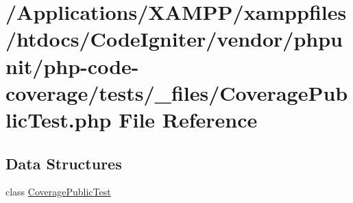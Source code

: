 \hypertarget{php-code-coverage_2tests_2__files_2_coverage_public_test_8php}{}\section{/\+Applications/\+X\+A\+M\+P\+P/xamppfiles/htdocs/\+Code\+Igniter/vendor/phpunit/php-\/code-\/coverage/tests/\+\_\+files/\+Coverage\+Public\+Test.php File Reference}
\label{php-code-coverage_2tests_2__files_2_coverage_public_test_8php}
\subsection*{Data Structures}
\begin{DoxyCompactItemize}
\item 
class \mbox{\hyperlink{class_coverage_public_test}{Coverage\+Public\+Test}}
\end{DoxyCompactItemize}
